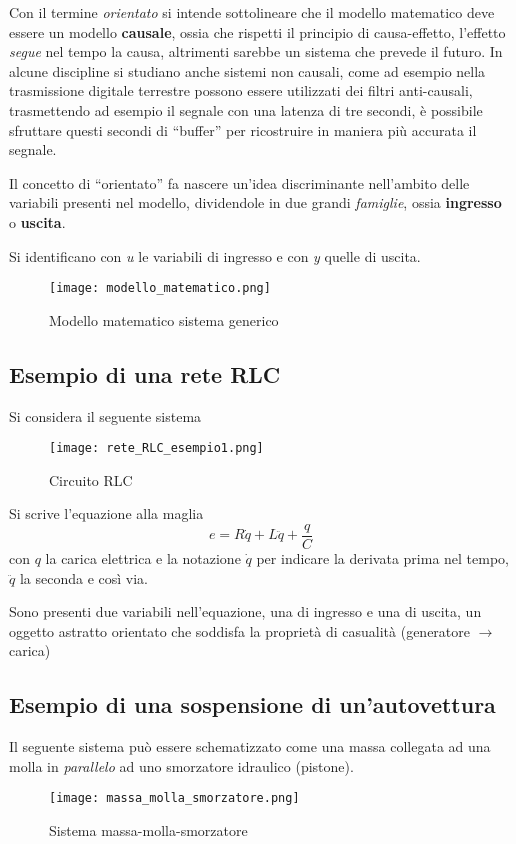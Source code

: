 Con il termine \textit{orientato} si intende sottolineare che il modello matematico deve essere un
modello \textbf{causale}, ossia che rispetti il principio di causa-effetto, l'effetto
\textit{segue} nel tempo la causa, altrimenti sarebbe un sistema che prevede il futuro. In alcune
discipline si studiano anche sistemi non causali, come ad esempio nella trasmissione digitale
terrestre possono essere utilizzati dei filtri anti-causali, trasmettendo ad esempio il segnale con
una latenza di tre secondi, è possibile sfruttare questi secondi di ``buffer'' per ricostruire in
maniera più accurata il segnale.

Il concetto di ``orientato'' fa nascere un'idea discriminante nell'ambito delle variabili presenti
nel modello, dividendole in due grandi \textit{famiglie}, ossia
\textbf{ingresso} o \textbf{uscita}.

Si identificano con \textit{u} le variabili di ingresso e con \textit{y} quelle di uscita.
\begin{figure}[h]
 \centering
 \texttt{[image: modello\_matematico.png]}
 \label{Fig.:modello_matematico}
 \caption{Modello matematico sistema generico}
\end{figure}

\subsection{Esempio di una rete RLC}
Si considera il seguente sistema
 \begin{figure}[h]
 \centering
 \texttt{[image: rete\_RLC\_esempio1.png]}
 \caption{Circuito RLC}
 \label{Fig.:circuito_RLC}
 \end{figure}
Si scrive l'equazione alla maglia
\begin{equation}
 e = R \dot{q} + L\ddot{q} + \frac{q}{C}
 \label{eq:equazione_RLC}
\end{equation}
con $q$ la carica elettrica e la notazione $\dot{q}$ per indicare la derivata prima nel tempo,
$\ddot{q}$ la seconda e così via.

Sono presenti due variabili nell'equazione, una di ingresso e una di uscita, un oggetto astratto
orientato che soddisfa la proprietà di casualità (generatore $\rightarrow$ carica)

\newpage
\subsection{Esempio di una sospensione di un'autovettura}
Il seguente sistema può essere schematizzato come una massa collegata ad una molla in
\textit{parallelo} ad uno smorzatore idraulico (pistone).
\begin{figure}[h]
 \centering \texttt{[image: massa\_molla\_smorzatore.png]}
 \caption{Sistema massa-molla-smorzatore}
 \label{Fig.:massa_molla_smorzatore}
\end{figure}


